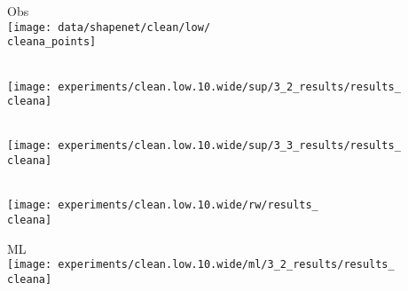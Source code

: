 \newcommand{\cleana}{231} %
\newcommand{\cleanb}{297}

\newcommand{\noisya}{132}
\newcommand{\noisyb}{66}

\newcommand{\kittia}{0}
\newcommand{\kittib}{612}
\newcommand{\kittic}{1224}
\newcommand{\kittid}{2754}
\newcommand{\kittie}{3060}
\newcommand{\kittif}{5508}
\begin{minipage}[t]{0.02\textwidth}
    \vspace{0px}\centering
\end{minipage}
\begin{minipage}[t]{0.1\textwidth}
    \vspace{0px}\centering
    \small Obs\\
    \texttt{[image: data/shapenet/clean/low/\\cleana\_points]}
\end{minipage}
\begin{minipage}[t]{0.1\textwidth}
    \vspace{0px}\centering
    \small \cite{Dai2017CVPRa}\\
    \texttt{[image: experiments/clean.low.10.wide/sup/3\_2\_results/results\_\\cleana]}
\end{minipage}
\begin{minipage}[t]{0.1\textwidth}
    \vspace{0px}\centering
    \small \cite{Dai2017CVPRa}\\
    \texttt{[image: experiments/clean.low.10.wide/sup/3\_3\_results/results\_\\cleana]}
\end{minipage}
\begin{minipage}[t]{0.1\textwidth}
    \vspace{0px}\centering
    \small \cite{Engelmann2016GCPR}\\
    \texttt{[image: experiments/clean.low.10.wide/rw/results\_\\cleana]}
\end{minipage}
\begin{minipage}[t]{0.1\textwidth}
    \vspace{0px}\centering
    \small ML\\
    \texttt{[image: experiments/clean.low.10.wide/ml/3\_2\_results/results\_\\cleana]}
\end{minipage}
